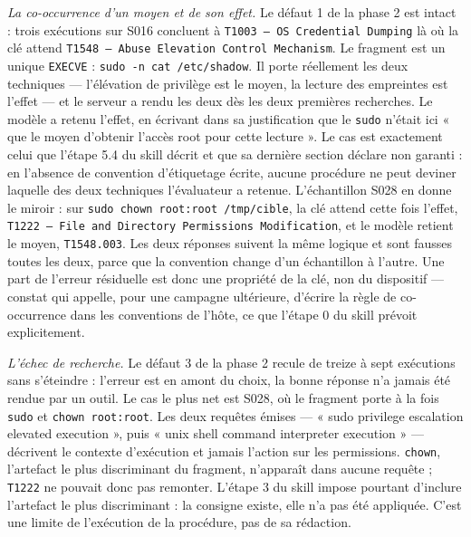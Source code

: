 \emph{La co-occurrence d'un moyen et de son effet.} Le défaut 1 de la phase 2 est intact : trois exécutions sur S016 concluent à \texttt{T1003 --- OS Credential Dumping} là où la clé attend \texttt{T1548 --- Abuse Elevation Control Mechanism}. Le fragment est un unique \texttt{EXECVE} : \texttt{sudo -n cat /etc/shadow}. Il porte réellement les deux techniques --- l'élévation de privilège est le moyen, la lecture des empreintes est l'effet --- et le serveur a rendu les deux dès les deux premières recherches. Le modèle a retenu l'effet, en écrivant dans sa justification que le \texttt{sudo} n'était ici « que le moyen d'obtenir l'accès root pour cette lecture ». Le cas est exactement celui que l'étape 5.4 du skill décrit et que sa dernière section déclare non garanti : en l'absence de convention d'étiquetage écrite, aucune procédure ne peut deviner laquelle des deux techniques l'évaluateur a retenue. L'échantillon S028 en donne le miroir : sur \texttt{sudo chown root:root /tmp/cible}, la clé attend cette fois l'effet, \texttt{T1222 --- File and Directory Permissions Modification}, et le modèle retient le moyen, \texttt{T1548.003}. Les deux réponses suivent la même logique et sont fausses toutes les deux, parce que la convention change d'un échantillon à l'autre. Une part de l'erreur résiduelle est donc une propriété de la clé, non du dispositif --- constat qui appelle, pour une campagne ultérieure, d'écrire la règle de co-occurrence dans les conventions de l'hôte, ce que l'étape 0 du skill prévoit explicitement.

\emph{L'échec de recherche.} Le défaut 3 de la phase 2 recule de treize à sept exécutions sans s'éteindre : l'erreur est en amont du choix, la bonne réponse n'a jamais été rendue par un outil. Le cas le plus net est S028, où le fragment porte à la fois \texttt{sudo} et \texttt{chown root:root}. Les deux requêtes émises --- « sudo privilege escalation elevated execution », puis « unix shell command interpreter execution » --- décrivent le contexte d'exécution et jamais l'action sur les permissions. \texttt{chown}, l'artefact le plus discriminant du fragment, n'apparaît dans aucune requête ; \texttt{T1222} ne pouvait donc pas remonter. L'étape 3 du skill impose pourtant d'inclure l'artefact le plus discriminant : la consigne existe, elle n'a pas été appliquée. C'est une limite de l'exécution de la procédure, pas de sa rédaction.

